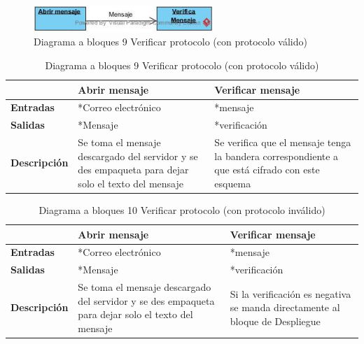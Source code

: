 \documentclass[12pt,oneside,onecolumn,openany]{report}
\begin{document}
\begin{figure}[H]
	\includegraphics[width=1\linewidth, height=1cm]{./images/bloques9.jpg}
	\caption{Diagrama a bloques 9 Verificar protocolo (con protocolo válido)}
	\label{fig:5-9-1}
\end{figure}
\begin{table}[H]
 \centering
   {
     \begin{tabular}{| p{3cm} | p{4cm} | p{4cm} |}
     \hline
     & \textbf{Abrir mensaje} & \textbf{Verificar mensaje}\\
     \hline
     \textbf{Entradas} & *Correo electrónico & *mensaje\\
     \hline
     \textbf{Salidas} & *Mensaje & *verificación\\
     \hline
     \textbf{Descripción} & Se toma el mensaje descargado del servidor y se des empaqueta para dejar solo el texto del mensaje & Se verifica que el mensaje tenga la bandera correspondiente a que está cifrado con este esquema\\

    \end{tabular}
    }
    \caption{Diagrama a bloques 9 Verificar protocolo (con protocolo válido)}
    \label{tabla:b9}
\end{table}


\clearpage
\begin{table}[H]
 \centering
   {
     \begin{tabular}{| p{3cm} | p{4cm} | p{4cm} |}
     \hline
     & \textbf{Abrir mensaje} & \textbf{Verificar mensaje}\\
     \hline
     \textbf{Entradas} & *Correo electrónico & *mensaje\\
     \hline
     \textbf{Salidas} & *Mensaje & *verificación\\
     \hline
     \textbf{Descripción} & Se toma el mensaje descargado del servidor y se des empaqueta para dejar solo el texto del mensaje & Si la verificación es negativa se manda directamente al bloque de Despliegue\\

    \end{tabular}
    }
    \caption{Diagrama a bloques 10 Verificar protocolo (con protocolo inválido)	}
    \label{tabla:b10}
\end{table}
\end{document}
